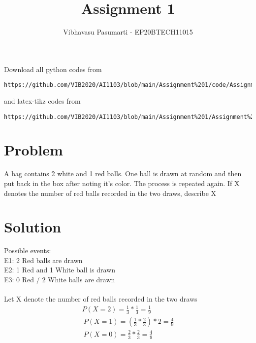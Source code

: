 \documentclass[journal,12pt,twocolumn]{IEEEtran}
\begin{document}
\title{Assignment 1}
\author{Vibhavasu Pasumarti - EP20BTECH11015}
\maketitle
\newpage
\bigskip
\renewcommand{\thefigure}{\theenumi}
\renewcommand{\thetable}{\theenumi}
Download all python codes from 
\begin{lstlisting}
https://github.com/VIB2020/AI1103/blob/main/Assignment%201/code/Assignment_1.py
\end{lstlisting}
%
and latex-tikz codes from 
%
\begin{lstlisting}
https://github.com/VIB2020/AI1103/blob/main/Assignment%201/Assignment%201.tex
\end{lstlisting}
\section{Problem}
A bag contains 2 white and 1 red balls. One ball is 
drawn at random and then put back in the box after 
noting it's color. The process is repeated again. 
If X denotes the number of red balls recorded in the
two draws, describe X
\section{Solution}

Possible events:\\
E1: 2 Red balls are drawn\\
E2: 1 Red and 1 White ball is drawn\\
E3: 0 Red / 2 White balls are drawn\\\\
Let X denote the number of red balls recorded in 
the two draws\\
\begin{align}
P(X = 2) = \frac{1}{3} * \frac{1}{3} = \frac{1}{9}\\\
P(X = 1) = \left(\frac{1}{3} * \frac{2}{3}\right) * 2 = \frac{4}{9}\\\
P(X = 0) = \frac{2}{3} * \frac{2}{3} = \frac{4}{9}
\end{align}
\end{document}
